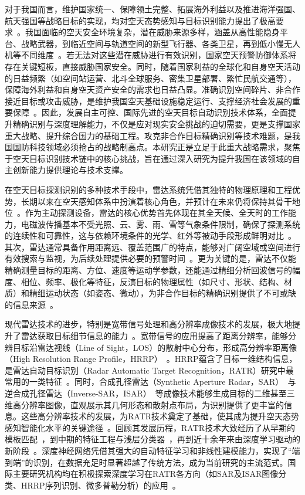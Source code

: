 对于我国而言，维护国家统一、保障领土完整、拓展海外利益以及推进海洋强国、航天强国等战略目标的实现，均对空天态势感知与目标识别能力提出了极高要求~\cite{X}。我国面临的空天安全环境复杂，潜在威胁来源多样，涵盖从高性能隐身平台、战略武器，到临近空间与轨道空间的新型飞行器、各类卫星，再到低小慢无人机等不同维度~\cite{X}。若无法对这些潜在威胁进行有效识别，国家空天预警防御体系将存在关键短板，直接威胁国家安全。同时，随着国家利益的全球化和自身空天活动的日益频繁（如空间站运营、北斗全球服务、密集卫星部署、繁忙民航交通等），保障海外利益和自身空天资产安全的需求也日益凸显。准确识别空间碎片、非合作接近目标或攻击威胁，是维护我国空天基础设施稳定运行、支撑经济社会发展的重要保障~\cite{X}。因此，发展自主可控、国际先进的空天目标自动识别技术体系，全面提升精确识别与深度理解能力，不仅是应对现实安全挑战的迫切需要，更是支撑国家重大战略、提升综合国力的基础工程。攻克非合作目标精确识别等技术难题，是我国国防科技领域必须抢占的战略制高点。本研究正是立足于此重大战略需求，聚焦于空天目标识别技术链中的核心挑战，旨在通过深入研究为提升我国在该领域的自主创新能力提供理论与技术支撑。

在空天目标探测识别的多种技术手段中，雷达系统凭借其独特的物理原理和工程优势，长期以来在空天感知体系中扮演着核心角色，并预计在未来仍将保持其骨干地位~\cite{X}。作为主动探测设备，雷达的核心优势首先体现在其{全天候、全天时}的工作能力，电磁波传播基本不受光照、云、雾、雨、雪等气象条件限制，确保了探测系统的连续性和可靠性，这与依赖环境条件的光学、红外等被动手段形成鲜明对比~\cite{X}。其次，雷达通常具备{作用距离远、覆盖范围广}的特点，能够对广阔空域或空间进行有效搜索与监视，为后续处理提供必要的预警时间~\cite{X}。更为关键的是，雷达不仅能精确测量目标的距离、方位、速度等运动学参数，还能通过精细分析回波信号的{幅度、相位、频率、极化}等特征，反演目标的{物理属性}（如尺寸、形状、结构、材质）和{精细运动状态}（如姿态、微动），为非合作目标的精确识别提供了不可或缺的信息来源~\cite{X}。

现代雷达技术的进步，特别是宽带信号处理和高分辨率成像技术的发展，极大地提升了雷达获取目标细节信息的能力~\cite{X}。宽带信号的应用提高了距离分辨率，能够分辨目标沿雷达视线（Line of Sight，LOS）的散射中心分布，形成{高分辨率距离像（High Resolution Range Profile，HRRP）}~\cite{X}。HRRP蕴含了目标一维结构信息，是雷达自动目标识别（Radar Automatic Target Recognition，RATR）研究中最常用的一类特征~\cite{X}。同时，{合成孔径雷达（Synthetic Aperture Radar，SAR）}~\cite{X}与{逆合成孔径雷达（Inverse-SAR，ISAR）}~\cite{X}等成像技术能够生成目标的二维甚至三维高分辨率图像，直观展示其几何形态和散射点布局，为识别提供了更丰富的信息。这些高分辨率技术的发展，为RATR技术奠定了基础，使其成为提升空天态势感知智能化水平的关键途径~\cite{X}。回顾其发展历程，RATR技术大致经历了从早期的{模板匹配}~\cite{X}，到中期的{特征工程与浅层分类器}~\cite{X}，再到近十余年来由{深度学习}驱动的新阶段~\cite{X}。深度神经网络凭借其强大的{自动特征学习}和{非线性建模}能力，实现了“端到端”的识别，在数据充足时显著超越了传统方法，成为当前研究的主流范式。国际主要研究机构均在积极探索深度学习在RATR各方向（如SAR及ISAR图像分类、HRRP序列识别、微多普勒分析）的应用~\cite{X}。

